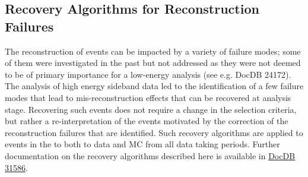 \subsection{Recovery Algorithms for Reconstruction Failures}
\label{sec:sideband:recovery}
The reconstruction of \npsel events can be impacted by a variety of failure modes; some of them were investigated in the past but not addressed as they were not deemed to be of primary importance for a low-energy analysis (see e.g. DocDB 24172). The analysis of high energy sideband data led to the identification of a few failure modes that lead to mis-reconstruction effects that can be recovered at analysis stage. Recovering such events does not require a change in the selection criteria, but rather a re-interpretation of the events motivated by the correction of the reconstruction failures that are identified. Such recovery algorithms are applied to events in the \npsel to both to data and MC from all data taking periods. Further documentation on the recovery algorithms described here is available in \href{https://microboone-docdb.fnal.gov/cgi-bin/private/RetrieveFile?docid=31586&filename=failure-modes-recovery-algos-final-update.pdf&version=1}{DocDB 31586}.


